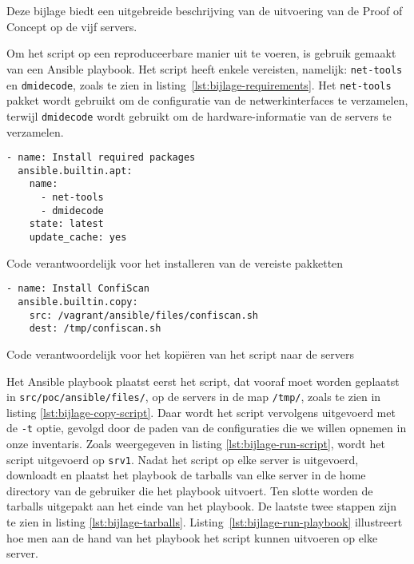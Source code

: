 
\chapter{}
\label{ch:bijlage_poc_uitvoering}

Deze bijlage biedt een uitgebreide beschrijving van de uitvoering van de Proof of Concept op de vijf servers.

Om het script op een reproduceerbare manier uit te voeren, is gebruik gemaakt van een Ansible playbook.
Het script heeft enkele vereisten, namelijk: \texttt{net-tools} en \texttt{dmidecode}, zoals te zien in listing~\ref{lst:bijlage-requirements}.
Het \texttt{net-tools} pakket wordt gebruikt om de configuratie van de netwerkinterfaces te verzamelen, terwijl \texttt{dmidecode} wordt gebruikt om de hardware-informatie van de servers te verzamelen.

\begin{listing}
  \begin{verbatim}
- name: Install required packages
  ansible.builtin.apt:
    name:
      - net-tools
      - dmidecode
    state: latest
    update_cache: yes
  \end{verbatim}
  \caption{Code verantwoordelijk voor het installeren van de vereiste pakketten}
  \label{lst:bijlage-requirements}
\end{listing}

\begin{listing}
  \begin{verbatim}
- name: Install ConfiScan
  ansible.builtin.copy:
    src: /vagrant/ansible/files/confiscan.sh
    dest: /tmp/confiscan.sh
  \end{verbatim}
  \caption{Code verantwoordelijk voor het kopiëren van het script naar de servers}
  \label{lst:bijlage-copy-script}
\end{listing}

Het Ansible playbook plaatst eerst het script, dat vooraf moet worden geplaatst in \texttt{src/poc/ansible/files/}, op de servers in de map \texttt{/tmp/}, zoals te zien in listing \ref{lst:bijlage-copy-script}.
Daar wordt het script vervolgens uitgevoerd met de \texttt{-t} optie, gevolgd door de paden van de configuraties die we willen opnemen in onze inventaris.
Zoals weergegeven in listing \ref{lst:bijlage-run-script}, wordt het script uitgevoerd op \texttt{srv1}.
Nadat het script op elke server is uitgevoerd, downloadt en plaatst het playbook de tarballs van elke server in de home directory van de gebruiker die het playbook uitvoert.
Ten slotte worden de tarballs uitgepakt aan het einde van het playbook.
De laatste twee stappen zijn te zien in listing \ref{lst:bijlage-tarballs}.
Listing~\ref{lst:bijlage-run-playbook} illustreert hoe men aan de hand van het playbook het script kunnen uitvoeren op elke server.

